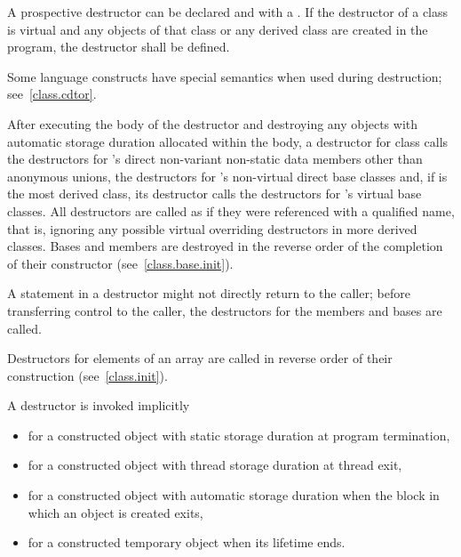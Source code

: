 \pnum
{}%
%
A prospective destructor can be
declared 
and with a .
If the destructor of a class is virtual and
any objects of that class or any derived class are created in the program,
the destructor shall be defined.

\pnum
\begin{note}
%
Some language constructs have special semantics when used during destruction;
see~\ref{class.cdtor}.
\end{note}

\pnum
{}%
%
%
After executing the body of the destructor and destroying
any objects with automatic storage duration allocated within the body, a
destructor for class
calls the destructors for
's
direct non-variant non-static data members other than anonymous unions,
the destructors for
's
non-virtual direct base classes and, if
is the most derived class,
its destructor calls the destructors for
's
virtual base classes.
All destructors are called as if they were referenced with a qualified name,
that is, ignoring any possible virtual overriding destructors in more
derived classes.
Bases and members are destroyed in the reverse order of the completion of
their constructor (see~\ref{class.base.init}).
\begin{note}
A
statement in a destructor might not directly return to the
caller; before transferring control to the caller, the destructors for the
members and bases are called.
\end{note}
%
Destructors for elements of an array are called in reverse order of their
construction (see~\ref{class.init}).

\pnum
{}%
%
A destructor is invoked implicitly
\begin{itemize}
\item for a constructed object with static storage duration at program termination,

\item for a constructed object with thread storage duration at thread exit,

\item for a constructed object with automatic storage duration when the block in which an object is created exits,

\item for a constructed temporary object when its lifetime ends.
\end{itemize}

